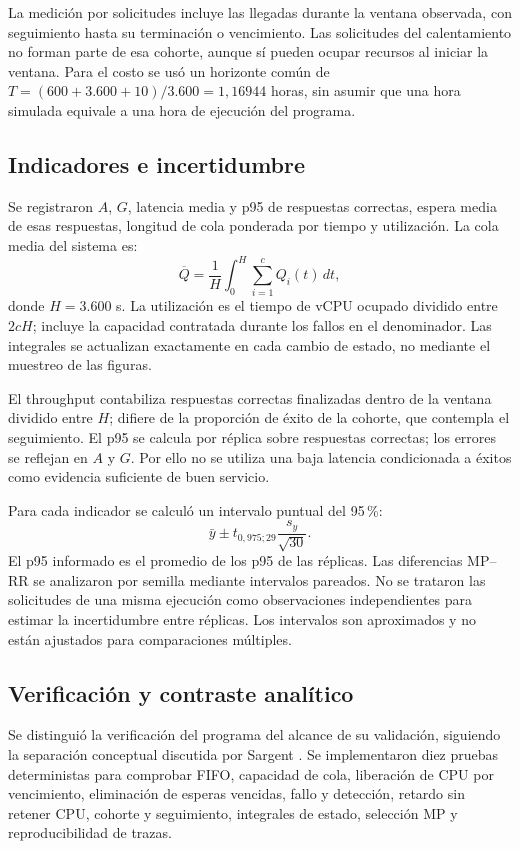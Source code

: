 La medición por solicitudes incluye las llegadas durante la ventana observada, con seguimiento hasta su terminación o vencimiento. Las solicitudes del calentamiento no forman parte de esa cohorte, aunque sí pueden ocupar recursos al iniciar la ventana. Para el costo se usó un horizonte común de $T=(600+3.600+10)/3.600=1,16944$ horas, sin asumir que una hora simulada equivale a una hora de ejecución del programa.

\subsection{Indicadores e incertidumbre}
Se registraron $A$, $G$, latencia media y p95 de respuestas correctas, espera media de esas respuestas, longitud de cola ponderada por tiempo y utilización. La cola media del sistema es:
\begin{equation}
\overline Q=\frac{1}{H}\int_0^H\sum_{i=1}^{c}Q_i(t)\,dt,
\end{equation}
donde $H=3.600$ s. La utilización es el tiempo de vCPU ocupado dividido entre $2cH$; incluye la capacidad contratada durante los fallos en el denominador. Las integrales se actualizan exactamente en cada cambio de estado, no mediante el muestreo de las figuras.

El throughput contabiliza respuestas correctas finalizadas dentro de la ventana dividido entre $H$; difiere de la proporción de éxito de la cohorte, que contempla el seguimiento. El p95 se calcula por réplica sobre respuestas correctas; los errores se reflejan en $A$ y $G$. Por ello no se utiliza una baja latencia condicionada a éxitos como evidencia suficiente de buen servicio.

Para cada indicador se calculó un intervalo puntual del 95\,\%:
\begin{equation}
\bar y\pm t_{0,975;29}\frac{s_y}{\sqrt{30}}.
\end{equation}
El p95 informado es el promedio de los p95 de las réplicas. Las diferencias MP--RR se analizaron por semilla mediante intervalos pareados. No se trataron las solicitudes de una misma ejecución como observaciones independientes para estimar la incertidumbre entre réplicas. Los intervalos son aproximados y no están ajustados para comparaciones múltiples.

\subsection{Verificación y contraste analítico}
Se distinguió la verificación del programa del alcance de su validación, siguiendo la separación conceptual discutida por Sargent \cite{sargent}. Se implementaron diez pruebas deterministas para comprobar FIFO, capacidad de cola, liberación de CPU por vencimiento, eliminación de esperas vencidas, fallo y detección, retardo sin retener CPU, cohorte y seguimiento, integrales de estado, selección MP y reproducibilidad de trazas.

